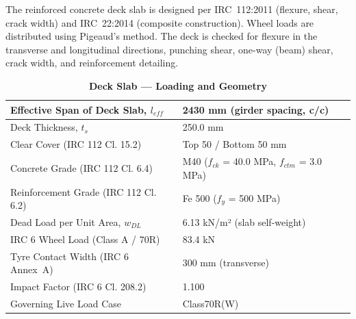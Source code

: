 \documentclass[12pt,a4paper]{report}
\numberwithin{table}{chapter}
\numberwithin{figure}{chapter}
\begin{document}
The reinforced concrete deck slab is designed per IRC~112:2011 (flexure, shear, crack width) and IRC~22:2014 (composite construction). Wheel loads are distributed using Pigeaud's method. The deck is checked for flexure in the transverse and longitudinal directions, punching shear, one-way (beam) shear, crack width, and reinforcement detailing.

\vspace{1em}
\begin{longtable}{|L{5.5cm}|p{10.0cm}|}
\caption{\textbf{Deck Slab --- Loading and Geometry}}
\hline
\textnormal{Effective Span of Deck Slab, $l_{eff}$} & 2430 mm (girder spacing, c/c) \\[6pt]
\hline
\textnormal{Deck Thickness, $t_s$} & 250.0 mm \\[6pt]
\hline
\textnormal{Clear Cover (IRC 112 Cl. 15.2)} & Top 50 / Bottom 50 mm \\[6pt]
\hline
\textnormal{Concrete Grade (IRC 112 Cl. 6.4)} & M40 ($f_{ck}$ = 40.0 MPa, $f_{ctm}$ = 3.0 MPa) \\[6pt]
\hline
\textnormal{Reinforcement Grade (IRC 112 Cl. 6.2)} & Fe 500 ($f_y$ = 500 MPa) \\[6pt]
\hline
\textnormal{Dead Load per Unit Area, $w_{DL}$} & 6.13 kN/m² (slab self-weight) \\[6pt]
\hline
\textnormal{IRC 6 Wheel Load (Class A / 70R)} & 83.4 kN \\[6pt]
\hline
\textnormal{Tyre Contact Width (IRC 6 Annex~A)} & 300 mm (transverse) \\[6pt]
\hline
\textnormal{Impact Factor (IRC 6 Cl. 208.2)} & 1.100 \\[6pt]
\hline
\textnormal{Governing Live Load Case} & Class70R(W) \\[6pt]
\hline
\end{longtable}
\end{document}
